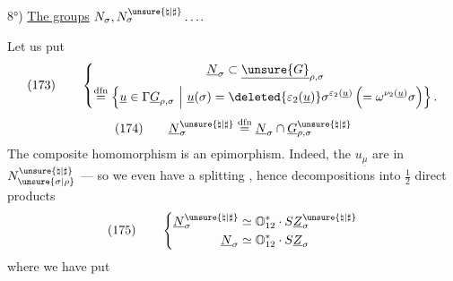 

8°) \uline{The groups} \(N_\sigma,N_\sigma^{\unsure{\natural|\sharp}}\ldots\).

Let us put
\[
(173)\qquad
\left\{
\begin{gathered}
\underline N_\sigma\subset\underline{\unsure{G}}_{\rho,\sigma}\\
\mathrel{\overset{\mathrm{dfn}}{=}}
\left\{\underline u\in\Gamma\underline G_{\rho,\sigma}\ \middle|\
\underline u(\sigma)=
\deleted{\varepsilon_2(\underline u)}
\sigma^{\varepsilon_2(\underline u)}
\left(=\omega^{\nu_2(\underline u)}\sigma\right)\right\}.
\end{gathered}
\right.
\]
\[
(174)\qquad
\underline N_\sigma^{\unsure{\natural|\sharp}}
\mathrel{\overset{\mathrm{dfn}}{=}}
\underline N_\sigma\cap\underline G_{\rho,\sigma}^{\unsure{\natural|\sharp}}
\]
The composite homomorphism
is an epimorphism. Indeed, the \(u_{\underline\mu}\) are in
\(N_{\unsure{\sigma|\rho}}^{\unsure{\natural|\sharp}}\) --- so we even have a splitting
,
hence decompositions into \(\frac12\) direct products
\[
(175)\qquad
\left\{
\begin{aligned}
\underline N_\sigma^{\unsure{\natural|\sharp}}
&\simeq\mathbb O_{12}^{*}\cdot S\underline Z_\sigma^{\unsure{\natural|\sharp}}\\
\underline N_\sigma
&\simeq\mathbb O_{12}^{*}\cdot S\underline Z_\sigma
\end{aligned}
\right.
\]
where we have put
